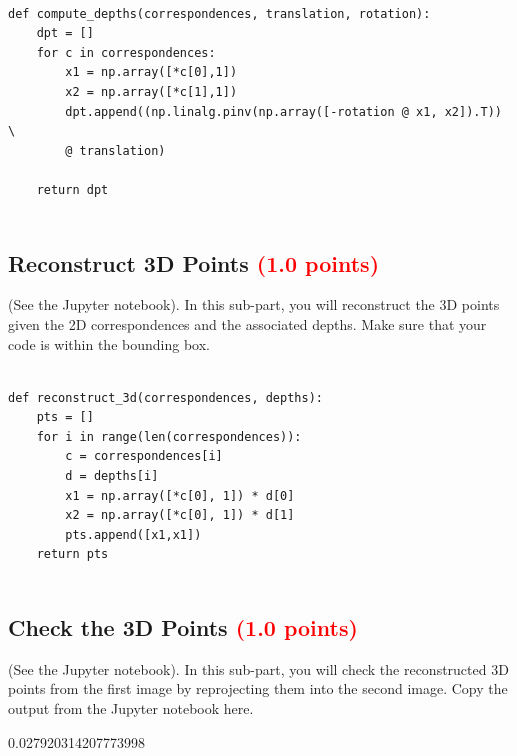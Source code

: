 \documentclass[answers]{exam}
\newcommand{\mypoints}[1]{\textcolor{red}{(#1 points)}}
\begin{document}
\begin{solution}
\begin{verbatim}

def compute_depths(correspondences, translation, rotation):
    dpt = []
    for c in correspondences:
        x1 = np.array([*c[0],1])
        x2 = np.array([*c[1],1])
        dpt.append((np.linalg.pinv(np.array([-rotation @ x1, x2]).T)) \ 
        @ translation)
        
    return dpt
    
\end{verbatim}
\end{solution}

\subsection{Reconstruct 3D Points \mypoints{1.0}}
(See the Jupyter notebook). In this sub-part, you will reconstruct the 3D points given the 2D correspondences and the associated depths. Make sure that your code is within the bounding box.

\begin{solution}
\begin{verbatim}

def reconstruct_3d(correspondences, depths):
    pts = []
    for i in range(len(correspondences)):
        c = correspondences[i]
        d = depths[i]
        x1 = np.array([*c[0], 1]) * d[0]
        x2 = np.array([*c[0], 1]) * d[1]
        pts.append([x1,x1])
    return pts
    
\end{verbatim}
\end{solution}

\subsection{Check the 3D Points \mypoints{1.0}}
(See the Jupyter notebook). In this sub-part, you will check the reconstructed 3D points from the first image by reprojecting them into the second image. Copy the output from the Jupyter notebook here.
\begin{solution}
0.027920314207773998
\end{solution}
\end{document}
